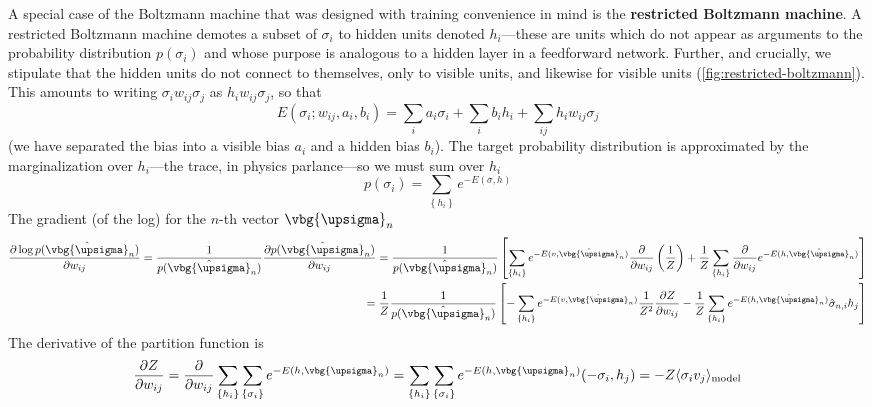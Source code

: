 \documentclass{report}
\begin{document}
A special case of the Boltzmann machine that was designed with training
convenience in mind is the \textbf{restricted Boltzmann machine}. A restricted 
Boltzmann machine demotes a subset of $ \sigma_i $ to hidden units denoted $ h_i
$---these are units which do not appear as arguments to the probability
distribution $ p(\sigma_i) $ and whose purpose is analogous to a hidden layer 
in a feedforward network. Further, and crucially, we stipulate that the 
hidden units do not connect to themselves, only to visible units, and likewise 
for visible units (\cref{fig:restricted-boltzmann}). This amounts to writing $
\sigma_i w_{ij} \sigma_j$ as $ h_i w_{ij} \sigma_j $, so that 
\begin{equation*}
	E(\sigma_i; w_{ij}, a_i, b_i)
		= \sum_i a_i \sigma_i + \sum_i b_i h_i + \sum_{ij} h_i w_{ij} \sigma_j
\end{equation*}
(we have separated the bias into a visible bias $ a_i $ and a hidden bias 
$ b_i $).
The target probability distribution is approximated by the marginalization 
over $ h_i $---the trace, in physics parlance---so we must sum over $ h_i $
\begin{equation*}
	p(\sigma_i) 
		= \sum_{\left\{h_i\right\}} e^{-E(\sigma, h)}
\end{equation*}
The gradient (of the log) for the $ n $-th vector $ \vbg{\upsigma}_n $
\begin{align*}
	\frac{\partial \log p(\hat{\vbg{\upsigma}}_n)}{\partial w_{ij}}
		= \frac{1}{p(\hat{\vbg{\upsigma}}_n)} \frac{\partial p(\hat{\vbg{\upsigma}}_n)}{\partial w_{ij}}
		= \frac{1}{p(\hat{\vbg{\upsigma}}_n)} \left[
			\sum_{\left\{h_i\right\}} e^{-E(v,\hat{\vbg{\upsigma}}_n)} 
			\frac{\partial }{\partial w_{ij}} \left(\frac{1}{Z}\right) 
			+ \frac{1}{Z} \sum_{\left\{h_i\right\}} \frac{\partial }{\partial w_{ij}}
				e^{-E(h, \hat{\vbg{\upsigma}}_n)}
		\right]
		\\ 
		= \frac{1}{Z}\frac{1}{p(\hat{\vbg{\upsigma}}_n)} \left[
			-\sum_{\left\{h_i\right\}} e^{-E(v,\hat{\vbg{\upsigma}}_n)} \frac{1}{Z^2} \frac{\partial Z }{\partial w_{ij}} 
			- \frac{1}{Z} \sum_{\left\{h_i\right\}} 
			e^{-E(h, \hat{\vbg{\upsigma}}_n)} \hat{\sigma}_{n,i} h_j
			\right]
\end{align*}
The derivative of the partition function is 
\begin{align*}
	\frac{\partial Z}{\partial w_{ij}}
		= \frac{\partial }{\partial w_{ij}} 
			\sum_{\left\{h_i\right\}}
			\sum_{\left\{\sigma_i\right\}}
			e^{-E(h, \vbg{\upsigma}_n)}
		= \sum_{\left\{h_i\right\}}
			\sum_{\left\{\sigma_i\right\}}
			e^{-E(h, \vbg{\upsigma}_n)}
			(-\sigma_i, h_j)
		= - Z \langle \sigma_i v_j \rangle_{\text{model}}
\end{align*}
\end{document}
